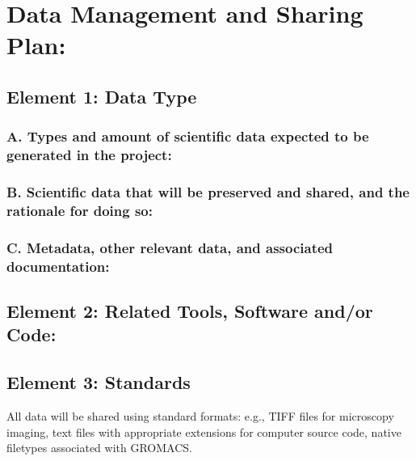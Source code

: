 \documentclass[../main.tex]{subfiles}
\begin{document}

\section*{Data Management and Sharing Plan:}

\subsection*{Element 1: Data Type}
\subsubsection*{A. Types and amount of scientific data expected to be generated in the project:}
\lipsum[1-3]

\subsubsection*{B. Scientific data that will be preserved and shared, and the rationale for doing so:}
\lipsum[1-3]

\subsubsection*{C. Metadata, other relevant data, and associated documentation:}
\lipsum[1-3]

\subsection*{Element 2: Related Tools, Software and/or Code:}
\lipsum[1-3]

\subsection*{Element 3: Standards}
All data will be shared using standard formats: e.g., TIFF files for microscopy imaging, text files with appropriate extensions for computer source code, native filetypes associated with GROMACS.
\end{document}
